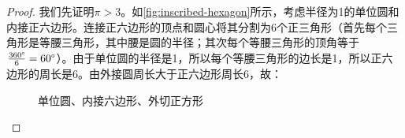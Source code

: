 \documentclass[b5paper]{ctexart}
\begin{document}
\begin{proof}
我们先证明$\pi > 3$。如\cref{fig:inscribed-hexagon}所示，考虑半径为1的单位圆和内接正六边形。连接正六边形的顶点和圆心将其分割为6个正三角形（首先每个三角形是等腰三角形，其中腰是圆的半径；其次每个等腰三角形的顶角等于$\frac{360\degree}{6} = 60\degree$）。由于单位圆的半径是1，所以每个等腰三角形的边长是1，所以正六边形的周长是6。由外接圆周长大于正六边形周长6，故：

\begin{figure}[htbp]
 \centering
 \caption{单位圆、内接六边形、外切正方形}
\end{figure}


\end{proof}
\end{document}
